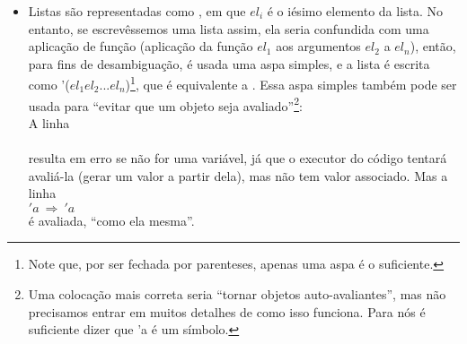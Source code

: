\begin{itemize}
\item Listas são representadas como , em que $el_i$ é o iésimo elemento da lista. No entanto, se
  escrevêssemos uma lista assim, ela seria
  confundida com uma aplicação de função (aplicação da função $el_1$
  aos argumentos $el_2$ a $el_n$), então, para fins de
  desambiguação, é usada uma aspa simples, e a lista é escrita como
  '($el_1 el_2 ... el_n$)\footnote{Note que, por ser fechada por
    parenteses, apenas uma aspa é o suficiente.}, que é equivalente a  . Essa aspa simples também pode ser usada para
  ``evitar que um objeto seja avaliado''\footnote{Uma colocação mais
    correta seria ``tornar objetos auto-avaliantes'', mas não
    precisamos entrar em muitos detalhes de como isso funciona. Para
    nós é suficiente dizer que 'a é um símbolo.}:\\
  A linha\\
  \\
  resulta em erro se  não for uma variável, já que
  o executor do código tentará avaliá-la (gerar um valor a partir
  dela), mas \codigo{a} não tem valor associado. Mas a linha\\
  $'a\ \Rightarrow\ 'a$\\
  é avaliada, ``como ela mesma''.\\


\end{itemize}
